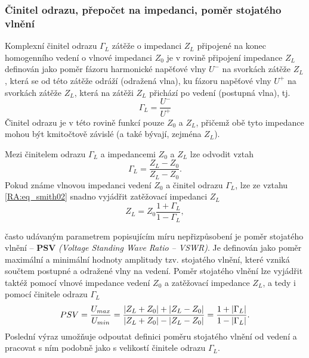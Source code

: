       \subsubsection{Činitel odrazu, přepočet na impedanci, poměr stojatého vlnění}
        Komplexní činitel odrazu \(\Gamma_L\) zátěže o impedanci \(Z_L\) připojené na konec 
        homogenního vedení o vlnové impedanci \(Z_0\) je v rovině připojení impedance \(Z_L\) 
        definován jako poměr fázoru harmonické napěťové vlny \(U^-\) na svorkách zátěže \(Z_L\), 
        která se od této zátěže odráží (odražená vlna), ku fázoru napěťové vlny \(U^+\) na svorkách 
        zátěže \(Z_L\), která na zátěži \(Z_L\) přichází po vedení (postupná vlna), tj.
        \begin{equation}\label{RA:eq_smith01}
          \Gamma_L = \frac{U^-}{U^+}
        \end{equation}
        Činitel odrazu je v této rovině funkcí pouze \(Z_0\) a \(Z_L\), přičemž obě tyto impedance 
        mohou být kmitočtově závislé (a také bývají, zejména \(Z_L\)).
  
        Mezi činitelem odrazu \(\Gamma_L\) a impedancemi \(Z_0\) a \(Z_L\) lze odvodit vztah
        \begin{equation}\label{RA:eq_smith02}
          \Gamma_L = \frac{Z_L-Z_0}{Z_L-Z_0}.
        \end{equation}    
        Pokud známe vlnovou impedanci vedení \(Z_0\) a činitel odrazu \(\Gamma_L\), lze ze vztahu 
        \ref{RA:eq_smith02} snadno vyjádřit zatěžovací impedanci \(Z_L\)
        \begin{equation}\label{RA:eq_smith03}
          Z_L = Z_0\frac{1+\Gamma_L}{1-\Gamma_L},
        \end{equation}    
  
        často udávaným parametrem popisujícím míru nepřizpůsobení je poměr stojatého vlnění – 
        \textbf{PSV} \emph{(Voltage Standing Wave Ratio – VSWR)}. Je definován jako poměr maximální 
        a minimální hodnoty amplitudy tzv. stojatého vlnění, které vzniká součtem postupné a 
        odražené vlny na vedení. Poměr stojatého vlnění lze vyjádřit taktéž pomocí vlnové impedance 
        vedení \(Z_0\) a zatěžovací impedance \(Z_L\), a tedy i pomocí činitele odrazu \(\Gamma_L\)
        \begin{equation}\label{RA:eq_smith04}
          PSV = \frac{U_{max}}{U_{min}} 
              = \frac{\left\lvert Z_L+Z_0\right\rvert + \left\lvert Z_L-Z_0\right\rvert}{\left\lvert Z_L+Z_0\right\rvert - \left\lvert Z_L-Z_0\right\rvert} 
              = \frac{1+\left\lvert\Gamma_L\right\rvert}{1-\left\lvert\Gamma_L\right\rvert}.
        \end{equation}
        Poslední výraz umožňuje odpoutat definici poměru stojatého vlnění od vedení a pracovat s 
        ním podobně jako s velikostí činitele odrazu \(\Gamma_L\).
      
